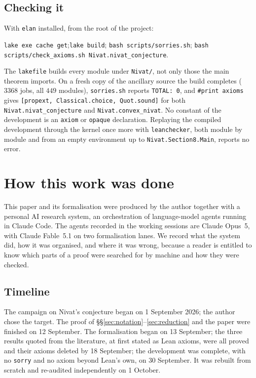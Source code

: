 \documentclass[11pt,reqno]{amsart}
\theoremstyle{plain}
\theoremstyle{definition}
\theoremstyle{remark}
\theoremstyle{plain}
\theoremstyle{remark}
\theoremstyle{definition}
\numberwithin{equation}{section}
\begin{document}
\subsection*{Checking it}
With \texttt{elan} installed, from the root of the project:
\begin{center}
\texttt{lake exe cache get};\quad \texttt{lake build};\quad
\texttt{bash scripts/sorries.sh};\quad
\texttt{bash scripts/check\_axioms.sh Nivat.nivat\_conjecture}.
\end{center}
The \texttt{lakefile} builds every module under \texttt{Nivat/}, not only those
the main theorem imports.  On a fresh copy of the ancillary source the build
completes ($3368$ jobs, all $449$ modules), \texttt{sorries.sh} reports
\texttt{TOTAL: 0}, and \texttt{\#print axioms} gives
\texttt{[propext, Classical.choice, Quot.sound]} for both
\texttt{Nivat.nivat\_conjecture} and \texttt{Nivat.convex\_nivat}.  No constant
of the development is an \texttt{axiom} or \texttt{opaque} declaration.
Replaying the compiled development through the kernel once more with
\texttt{leanchecker}, both module by module and from an empty environment up to
\texttt{Nivat.Section8.Main}, reports no error.

\section{How this work was done}\label{app:ai}

This paper and its formalisation were produced by the author together with a
personal AI research system, an orchestration of language-model agents running
in Claude Code.  The agents recorded in the working sessions are
Claude Opus~5, with Claude Fable~5.1 on two formalisation lanes.  We record what the system did, how it was organised, and where it
was wrong, because a reader is entitled to know which parts of a proof were
searched for by machine and how they were checked.

\subsection*{Timeline}
The campaign on Nivat's conjecture began on 1 September 2026; the author chose
the target.  The proof of \S\S\ref{sec:notation}--\ref{sec:reduction} and the
paper were finished on 12 September.  The formalisation began on 13 September;
the three results quoted from the literature, at first stated as Lean axioms,
were all proved and their axioms deleted by 18 September; the development was
complete, with no \texttt{sorry} and no axiom beyond Lean's own, on
30 September.  It was rebuilt from scratch and re-audited independently on
1 October.
\end{document}
